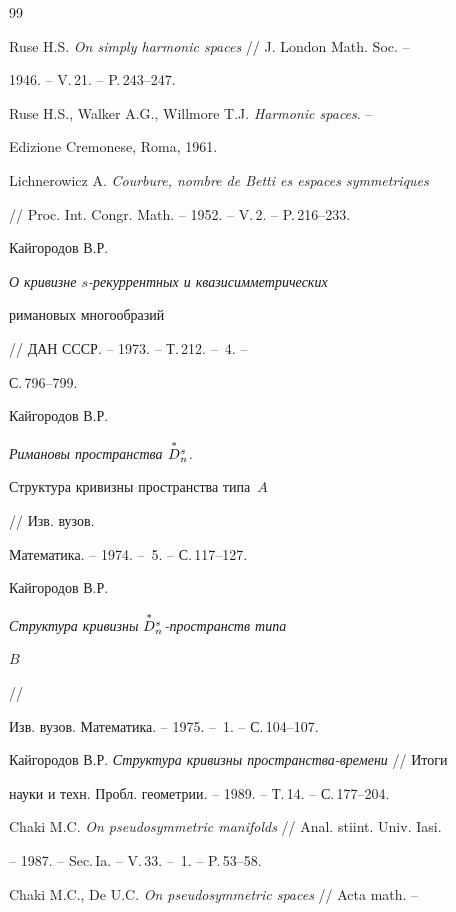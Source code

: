 \begin{thebibliography}{99} 


 




Ruse H.S. {\em On simply harmonic spaces} // J. London Math. Soc. -- 


1946. -- V.\,21. -- P.\,243--247. 




Ruse H.S., Walker A.G., Willmore T.J. {\em Harmonic spaces}. -- 


Edizione Cremonese, Roma, 1961. 




Lichnerowicz A. {\em Courbure, nombre de Betti es espaces symmetriques} 


// Proc. Int. Congr. Math. -- 1952. -- V.\,2. -- P.\,216--233. 




Кайгородов В.Р. {\em О кривизне $s$-рекуррентных и квазисимметрических 


римановых многообразий} // ДАН СССР. -- 1973. -- Т.\,212. -- \No\,4. -- 


С.\,796--799. 




Кайгородов В.Р. {\em Римановы пространства $\overset{*}{D}{}^s_n$.


Структура кривизны пространства типа~$A$} // Изв. вузов. 


Математика. -- 1974. -- \No\,5. -- С.\,117--127. 




Кайгородов В.Р. {\em Структура кривизны $\overset{*}{D}{}^s_n$-пространств типа


$B$} // 


Изв. вузов. Математика. -- 1975. -- \No\,1. -- С.\,104--107. 




Кайгородов В.Р. {\em Структура кривизны пространства-времени} // Итоги 


науки и техн. Пробл. геометрии. -- 1989. -- Т.\,14. -- С.\,177--204. 




Chaki M.C. {\em On pseudosymmetric manifolds} // Anal. stiint. Univ. Iasi. 


-- 1987. -- Sec.\,Ia. -- V.\,33. -- \No\,1. -- P.\,53--58. 




Chaki M.C., De U.C. {\em On pseudosymmetric spaces} // Acta math. -- 



\end{thebibliography}

